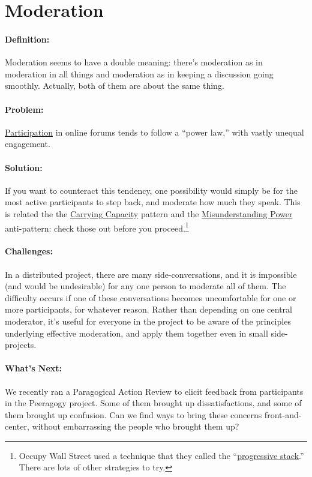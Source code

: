 \section{Moderation}
\paragraph{Definition:} Moderation seems to have a double meaning: there's
moderation as in moderation in all things and moderation as in keeping a
discussion going smoothly. Actually, both of them are about the same
thing.

\paragraph{Problem:}
\href{http://peeragogy.org/organizing-a-learning-context/participation/}{Participation}
in online forums tends to follow a ``power law,'' with vastly unequal
engagement.

\paragraph{Solution:} If you want to counteract this tendency, one
possibility would simply be for the most active participants to step
back, and moderate how much they speak. This is related the the
\href{http://peeragogy.org/patterns-usecases/patterns-and-heuristics/carrying-capacity/}{Carrying
Capacity} pattern and the
\href{http://peeragogy.org/practice/antipatterns/misunderstanding-power/}{Misunderstanding
Power} anti-pattern: check those out before you proceed.\footnote{Occupy Wall Street used a technique that they called
the ``\href{http://en.wikipedia.org/wiki/Progressive_stack}{progressive
stack}.'' There are lots of other strategies to try.}

\paragraph{Challenges:} In a distributed project, there are many
side-conversations, and it is impossible (and would be undesirable) for
any one person to moderate all of them. The difficulty occurs if one of
these conversations becomes uncomfortable for one or more participants,
for whatever reason. Rather than depending on one central moderator,
it's useful for everyone in the project to be aware of the principles
underlying effective moderation, and apply them together even in small
side-projects.

\paragraph{What's Next:} We recently ran a Paragogical Action Review to
elicit feedback from participants in the Peeragogy project. Some of them
brought up dissatisfactions, and some of them brought up confusion. Can
we find ways to bring these concerns front-and-center, without
embarrassing the people who brought them up?
